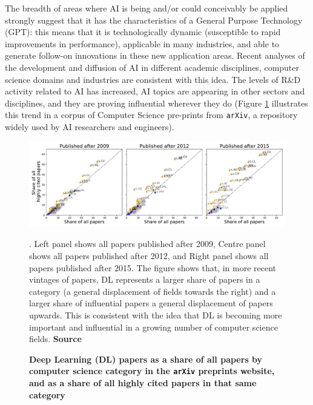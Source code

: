 \documentclass[11pt]{article}
\begin{document}
The breadth of areas where AI is being and/or could conceivably be applied strongly suggest that it has the characteristics of a General Purpose Technology (GPT): this means that it is technologically dynamic (susceptible to rapid improvements in performance), applicable in many industries, and able to generate follow-on innovations in these new application areas. Recent analyses of the development and diffusion of AI in different academic disciplines, computer science domains and industries are consistent with this idea. The levels of R\&D activity related to AI has increased, AI topics are appearing in other sectors and disciplines, and they are proving influential wherever they do (Figure \ref{fig:dl} illustrates this trend in a corpus of Computer Science pre-prints from \texttt{arXiv}, a repository widely used by AI researchers and engineers). 

\begin{figure}
    \centering
    \includegraphics[width=\textwidth]{figure_2.pdf}
    \caption \textbf{Deep Learning (DL) papers as a share of all papers by computer science category in the \texttt{arXiv} preprints website, and as a share of all highly cited papers in that same category}. Left panel shows all papers published after 2009, Centre panel shows all papers published after 2012, and Right panel shows all papers published after 2015. The figure shows that, in more recent vintages of papers, DL represents a larger share of papers in a category (a general displacement of fields towards the right) and a larger share of influential papers a general displacement of papers upwards. This is consistent with the idea that DL is becoming more important and influential in a growing number of computer science fields.
    \textbf{Source}
    \label{fig:dl}
\end{figure}
\end{document}
